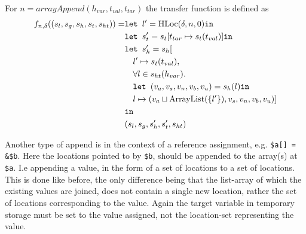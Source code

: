 For $n = \mathit{arrayAppend}(h_{var}, t_{val},t_{tar})$ the transfer function is defined as
\begin{align}
    f_{n,\delta}((s_l, s_g, s_h, s_t, s_{ht})) = &\texttt{let } l' = \text{HLoc}(\delta, n, 0) \texttt{in } \notag\\
                              &\texttt{let } s_t' = s_t[t_{tar}\mapsto s_t(t_{val})] \texttt{in }\notag\\
                              &\texttt{let } s_h' = s_h[\notag\\
                              &\quad l' \mapsto s_t(t_{val}), \notag\\
                              &\quad \forall l \in s_{ht}(h_{var}).\notag\\
                              &\quad\texttt{let } (v_a,v_s,v_n,v_b,v_u) = s_h(l) \texttt{in } \notag\\
                              &\quad l\mapsto (v_a \sqcup \text{ArrayList}(\{l'\}), v_s, v_n, v_b, v_u)]\notag\\
                              & \texttt{in }\notag\\
                              &(s_l, s_g, s_h', s_t', s_{ht})
\end{align}

Another type of append is in the context of a reference assignment, e.g. \texttt{\$a[] = \&\$b}. Here the locations pointed to by \texttt{\$b}, should be appended to the array(s) at \texttt{\$a}. I.e appending a value, in the form of a set of locations to a set of locations. This is done like before, the only difference being that the list-array of which the existing values are joined, does not contain a single new location, rather the set of locations corresponding to the value. Again the target variable in temporary storage must be set to the value assigned, not the location-set representing the value.

